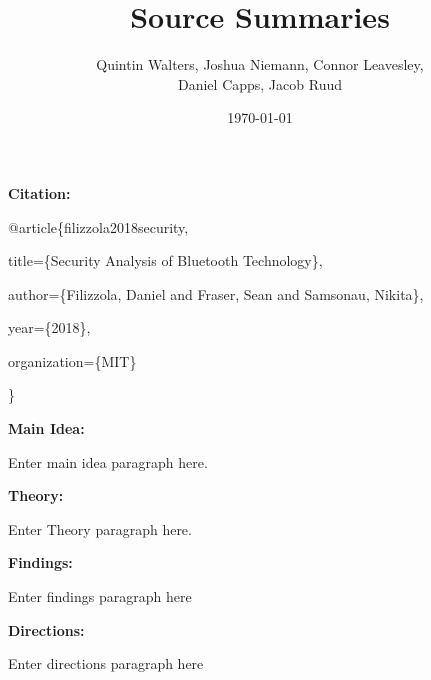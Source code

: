 \documentclass[a4paper,12pt]{article}
\begin{document}
    \title{Source Summaries}
    \author{Quintin Walters, Joshua Niemann, Connor Leavesley,\\
    Daniel Capps, Jacob Ruud}
    \date{\today}
    \maketitle
    
\noindent
\textbf{Citation:}

\noindent
@article\{filizzola2018security,

title=\{Security Analysis of Bluetooth Technology\},

author=\{Filizzola, Daniel and Fraser, Sean and Samsonau, Nikita\},

year=\{2018\},

organization=\{MIT\}

\noindent
\}

\vspace{5mm}
\noindent
\textbf{Main Idea:}

\noindent
Enter main idea paragraph here.

\vspace{5mm}
\noindent
\textbf{Theory:}

\noindent
Enter Theory paragraph here.

\vspace{5mm}   
\noindent
\textbf{Findings:}

\noindent
Enter findings paragraph here

\vspace{5mm}  
\noindent
\textbf{Directions:}

\noindent
Enter directions paragraph here
\end{document}
